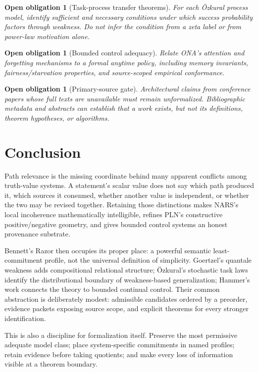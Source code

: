 \documentclass[11pt]{article}
\newtheorem{obligation}[definition]{Open obligation}
\theoremstyle{remark}
\begin{document}
\begin{obligation}[Task-process transfer theorems]
For each \"Ozkural process model, identify sufficient and necessary conditions
under which success probability factors through weakness.  Do not infer the
condition from a zeta label or from power-law motivation alone.
\end{obligation}

\begin{obligation}[Bounded control adequacy]
Relate ONA's attention and forgetting mechanisms to a formal anytime policy,
including memory invariants, fairness/starvation properties, and source-scoped
empirical conformance.
\end{obligation}

\begin{obligation}[Primary-source gate]
Architectural claims from conference papers whose full texts are unavailable
must remain unformalized.  Bibliographic metadata and abstracts can establish
that a work exists, but not its definitions, theorem hypotheses, or algorithms.
\end{obligation}

\section{Conclusion}

Path relevance is the missing coordinate behind many apparent conflicts among
truth-value systems.  A statement's scalar value does not say which path
produced it, which sources it consumed, whether another value is independent,
or whether the two may be revised together.  Retaining those distinctions
makes NARS's local incoherence mathematically intelligible, refines PLN's
constructive positive/negative geometry, and gives bounded control systems an
honest provenance substrate.

Bennett's Razor then occupies its proper place: a powerful semantic
least-commitment profile, not the universal definition of simplicity.
Goertzel's quantale weakness adds compositional relational structure;
\"Ozkural's stochastic task laws identify the distributional boundary of
weakness-based generalization; Hammer's work connects the theory to bounded
continual control.  Their common abstraction is deliberately modest:
admissible candidates ordered by a preorder, evidence packets exposing source
scope, and explicit theorems for every stronger identification.

This is also a discipline for formalization itself.  Preserve the most
permissive adequate model class; place system-specific commitments in named
profiles; retain evidence before taking quotients; and make every loss of
information visible at a theorem boundary.
\end{document}
